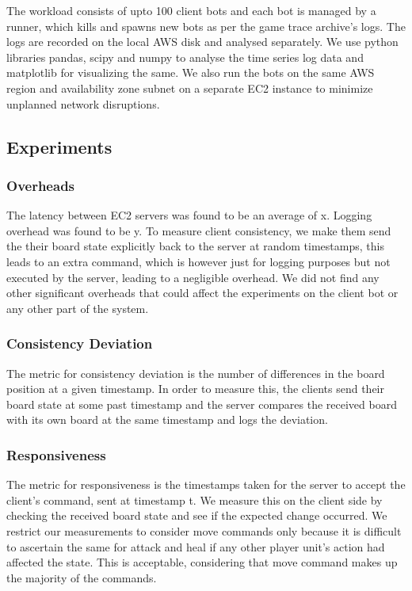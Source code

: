 \documentclass[a4paper]{IEEEtran}
\begin{document}
  The workload consists of upto 100 client bots and each bot is managed by a runner, which kills and spawns new bots as per the game trace archive's logs. The logs are recorded on the local AWS disk and analysed separately.
  We use python libraries pandas, scipy and numpy to analyse the time series log data and matplotlib for visualizing the same. We also run the bots on the same AWS region and availability zone subnet on a separate EC2 instance to minimize unplanned network disruptions.
  
  \subsection{Experiments}
  
  \subsubsection{Overheads}

  The latency between EC2 servers was found to be an average of x. Logging overhead was found to be y. To measure client consistency, we make them send the their board state explicitly back to the server at random timestamps, this leads to an extra command, which is however just for logging purposes but not executed by the server, leading to a negligible overhead. We did not find any other significant overheads that could affect the experiments on the client bot or any other part of the system.
  
  \subsubsection{Consistency Deviation}

  The metric for consistency deviation is the number of differences in the board position at a given timestamp. In order to measure this, the clients send their board state at some past timestamp and the server compares the received board with its own board at the same timestamp and logs the deviation.
  
  \subsubsection{Responsiveness}

  The metric for responsiveness is the timestamps taken for the server to accept the client's command, sent at timestamp t. We measure this on the client side by checking the received board state and see if the expected change occurred. We restrict our measurements to consider move commands only because it is difficult to ascertain the same for attack and heal if any other player unit's action had affected the state. This is acceptable, considering that move command makes up the majority of the commands. 
  
\end{document}
